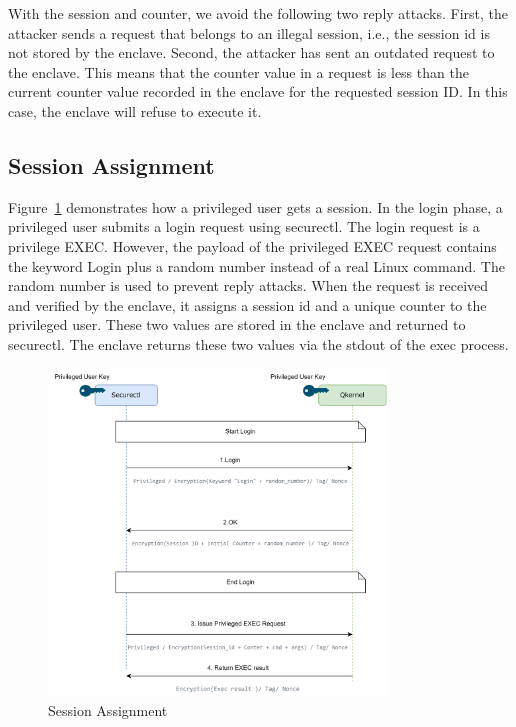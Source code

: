 With the session and counter, we avoid the following two reply attacks. First, the attacker sends a request that belongs to an illegal session, i.e., the session id is not stored by the enclave. Second, the attacker has sent an outdated request to 
the enclave. This means that the counter value in a request is less than the current counter value recorded in the enclave for the requested session ID. In this case, the enclave will refuse to execute it.

\subsection{Session Assignment}

Figure~\ref{fig:session_base_auth} demonstrates how a privileged user gets a session. In the login phase, a privileged user submits a login request using securectl. The login request is a privilege EXEC. However, the payload of the privileged EXEC 
request contains the keyword Login plus a random number instead of a real Linux command. The random number is used to prevent reply attacks. When the request is received and verified by the enclave,  it assigns a session id and a unique counter to 
the privileged user. These two values are stored in the enclave and returned to securectl. The enclave returns these two values via the stdout of the exec process.

\begin{figure}[H]
    \centering
    \includegraphics[width=0.8\textwidth]{images/session_base_auth.png}
    \caption[Session Assignment]{Session Assignment}
    \label{fig:session_base_auth}
\end{figure}

